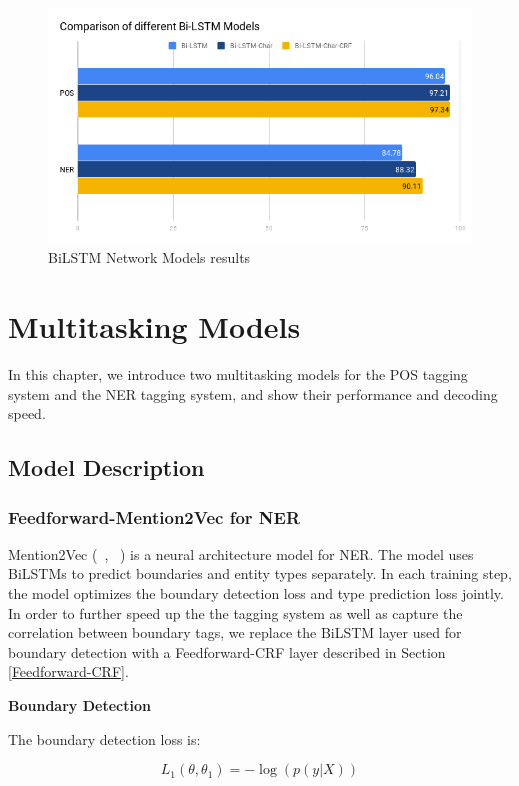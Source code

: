 \documentclass{sfuthesis}
\begin{document}
\begin{figure}
  \centering
  \includegraphics[scale=0.6]{lstm.png}
 \caption{BiLSTM Network Models results}
  \label{fig:lstm}
\end{figure}


\chapter{Multitasking Models}
In this chapter, we introduce two multitasking models for the POS tagging system and the NER tagging system, and show their performance and decoding speed. 
\section{Model Description}
\subsection{Feedforward-Mention2Vec for NER}
Mention2Vec (~\citeauthor{stratos2016mention2vec}, ~\citeyear{stratos2016mention2vec}) is a neural architecture model for NER. The model uses BiLSTMs to predict boundaries and entity types separately. In each training step, the model optimizes the boundary detection loss and type prediction loss jointly.  In order to further speed up the the tagging system as well as capture the correlation between boundary tags, we replace the BiLSTM layer used for boundary detection with a Feedforward-CRF layer described in Section \ref{Feedforward-CRF}.

\textbf{Boundary Detection} 

The boundary detection loss is:

\begin{equation}
  L_{1}\left( \theta ,\theta _{1}\right) =-\log \left( p\left( y|X\right) \right) 
\end{equation}
\end{document}
